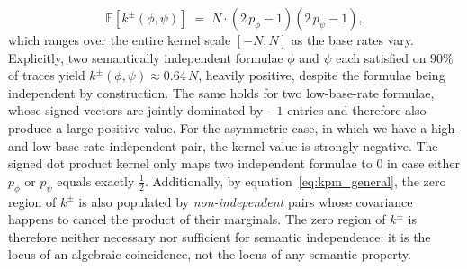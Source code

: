 \documentclass[titlepage,a4paper,11pt]{report}
\begin{document}
    \begin{equation}\label{eq:kpm_indep}
        \mathbb{E}\!\left[k^\pm(\phi, \psi)\right]
        \;=\;
        N \cdot (2\,p_\phi - 1)(2\,p_\psi - 1),
    \end{equation}
    which ranges over the entire kernel scale $[-N, N]$ as the base rates vary. Explicitly, two semantically independent formulae $\phi$ and $\psi$ each satisfied on $90\%$ of traces yield $k^\pm(\phi,\psi) \approx 0.64\,N$, heavily positive, despite the formulae being independent by construction. The same holds for two low-base-rate formulae, whose signed vectors are jointly dominated by $-1$ entries and therefore also produce a large positive value. For the asymmetric case, in which we have a high- and low-base-rate independent pair, the kernel value is strongly negative. The signed dot product kernel only maps two independent formulae to $0$ in case either $p_\phi$ or $p_\psi$ equals exactly $\tfrac{1}{2}$. Additionally, by equation~\eqref{eq:kpm_general}, the zero region of $k^\pm$ is also populated by \emph{non-independent} pairs whose covariance happens to cancel the product of their marginals. The zero region of $k^\pm$ is therefore neither necessary nor sufficient for semantic independence: it is the locus of an algebraic coincidence, not the locus of any semantic property.

\end{document}
